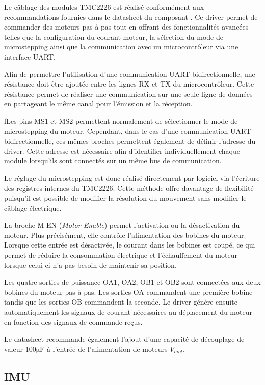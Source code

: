 Le câblage des modules TMC2226 est réalisé conformément aux recommandations fournies dans le datasheet du composant \cite{TMC2226_datasheet}. Ce driver permet de commander des moteurs pas à pas tout en offrant des fonctionnalités avancées telles que la configuration du courant moteur, la sélection du mode de microstepping ainsi que la communication avec un microcontrôleur via une interface UART.

Afin de permettre l'utilisation d'une communication UART bidirectionnelle, une résistance doit être ajoutée entre les lignes RX et TX du microcontrôleur. Cette résistance permet de réaliser une communication sur une seule ligne de données en partageant le même canal pour l'émission et la réception.

fLes pins MS1 et MS2 permettent normalement de sélectionner le mode de microstepping du moteur. Cependant, dans le cas d'une communication UART bidirectionnelle, ces mêmes broches permettent également de définir l'adresse du driver. Cette adresse est nécessaire afin d'identifier individuellement chaque module lorsqu'ils sont connectés sur un même bus de communication.

Le réglage du microstepping est donc réalisé directement par logiciel via l'écriture des registres internes du TMC2226. Cette méthode offre davantage de flexibilité puisqu'il est possible de modifier la résolution du mouvement sans modifier le câblage électrique.

La broche M EN (\textit{Motor Enable}) permet l'activation ou la désactivation du moteur. Plus précisément, elle contrôle l'alimentation des bobines du moteur. Lorsque cette entrée est désactivée, le courant dans les bobines est coupé, ce qui permet de réduire la consommation électrique et l'échauffement du moteur lorsque celui-ci n'a pas besoin de maintenir sa position.

Les quatre sorties de puissance OA1, OA2, OB1 et OB2 sont connectées aux deux bobines du moteur pas à pas. Les sorties OA commandent une première bobine tandis que les sorties OB commandent la seconde. Le driver génère ensuite automatiquement les signaux de courant nécessaires au déplacement du moteur en fonction des signaux de commande reçus.

Le datasheet recommande également l'ajout d'une capacité de découplage de valeur $100 \si{\micro\farad}$ à l'entrée de l'alimentation de moteurs $V_{mot}$.
\subsection{IMU}

